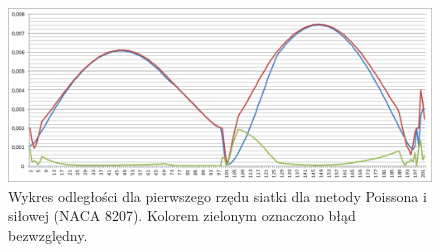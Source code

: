 \begin{figure}[b] 
	\includegraphics[trim = 30mm 0mm 0mm 0mm, width=1.1\linewidth]{Rysunki/NACA_8207_wykres_odleglosci.png}
	\caption{Wykres odległości dla pierwszego rzędu siatki dla metody \colorbox{blue!30}{Poissona} i \colorbox{red!30}{siłowej} (NACA 8207). Kolorem zielonym oznaczono \colorbox{green!30}{błąd bezwzględny}.}
	\label{fig:graph_NACA_8207}
\end{figure}